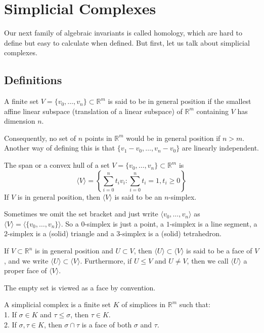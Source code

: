 \section{Simplicial Complexes}
Our next family of algebraic invariants is called homology, which are hard to define but easy to calculate when defined.
But first, let us talk about simplicial complexes.
\subsection{Definitions}
\begin{definition}
    A finite set $V=\{v_0,\ldots,v_n\}\subset\mathbb R^m$ is said to be in general position if the smallest affine linear subspace (translation of a linear subspace) of $\mathbb R^m$ containing $V$ has dimension $n$.
\end{definition}
Consequently, no set of $n$ points in $\mathbb R^m$ would be in general position if $n>m$.
Another way of defining this is that $\{v_1-v_0,\ldots,v_n-v_0\}$ are linearly independent.
\begin{definition}
    The span or a convex hull of a set $V=\{v_0,\ldots,v_n\}\subset\mathbb R^m$ is
    $$\langle V\rangle=\left\{ \sum_{i=0}^nt_iv_i:\sum_{i=0}^nt_i=1,t_i\ge 0\right\}$$
    If $V$ is in general position, then $\langle V\rangle$ is said to be an $n$-simplex.
\end{definition}
Sometimes we omit the set bracket and just write $\langle v_0,\ldots,v_n\rangle$ as $\langle V\rangle=\langle \{v_0,\ldots,v_n\}\rangle$.
So a $0$-simplex is just a point, a $1$-simplex is a line segment, a $2$-simplex is a (solid) triangle and a $3$-simplex is a (solid) tetrahedron.
\begin{definition}
    If $V\subset\mathbb R^n$ is in general position and $U\subset V$, then $\langle U\rangle\subset\langle V\rangle$ is said to be a face of $V$, and we write $\langle U\rangle\subset\langle V\rangle$.
    Furthermore, if $U\le V$ and $U\neq V$, then we call $\langle U\rangle$ a proper face of $\langle V\rangle$.
\end{definition}
The empty set is viewed as a face by convention.
\begin{definition}
    A simplicial complex is a finite set $K$ of simplices in $\mathbb R^m$ such that:\\
    1. If $\sigma\in K$ and $\tau\le\sigma$, then $\tau\in K$.\\
    2. If $\sigma,\tau\in K$, then $\sigma\cap\tau$ is a face of both $\sigma$ and $\tau$.
\end{definition}
